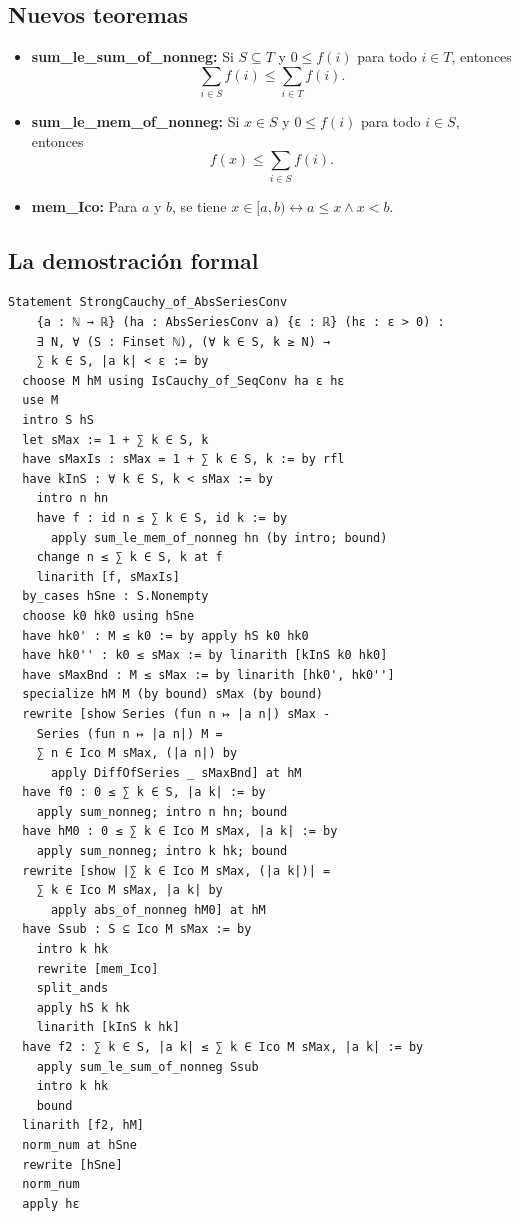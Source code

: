 \subsection{Nuevos teoremas}

\begin{itemize}
  \item \textbf{sum\_le\_sum\_of\_nonneg:} Si $S \subseteq T$ y $0 \le f(i)$ para todo $i \in T$, entonces
  \[
    \sum_{i \in S} f(i) \le \sum_{i \in T} f(i).
  \]
  \item \textbf{sum\_le\_mem\_of\_nonneg:} Si $x \in S$ y $0 \le f(i)$ para todo $i \in S$, entonces
  \[
    f(x) \le \sum_{i \in S} f(i).
  \]
  \item \textbf{mem\_Ico:} Para $a$ y $b$, se tiene $x \in [a, b) \leftrightarrow a \le x \wedge x < b$.
\end{itemize}

\subsection{La demostración formal}

\begin{verbatim}
Statement StrongCauchy_of_AbsSeriesConv
    {a : ℕ → ℝ} (ha : AbsSeriesConv a) {ε : ℝ} (hε : ε > 0) :
    ∃ N, ∀ (S : Finset ℕ), (∀ k ∈ S, k ≥ N) →
    ∑ k ∈ S, |a k| < ε := by
  choose M hM using IsCauchy_of_SeqConv ha ε hε
  use M
  intro S hS
  let sMax := 1 + ∑ k ∈ S, k
  have sMaxIs : sMax = 1 + ∑ k ∈ S, k := by rfl
  have kInS : ∀ k ∈ S, k < sMax := by
    intro n hn
    have f : id n ≤ ∑ k ∈ S, id k := by
      apply sum_le_mem_of_nonneg hn (by intro; bound)
    change n ≤ ∑ k ∈ S, k at f
    linarith [f, sMaxIs]
  by_cases hSne : S.Nonempty
  choose k0 hk0 using hSne
  have hk0' : M ≤ k0 := by apply hS k0 hk0
  have hk0'' : k0 ≤ sMax := by linarith [kInS k0 hk0]
  have sMaxBnd : M ≤ sMax := by linarith [hk0', hk0'']
  specialize hM M (by bound) sMax (by bound)
  rewrite [show Series (fun n ↦ |a n|) sMax -
    Series (fun n ↦ |a n|) M =
    ∑ n ∈ Ico M sMax, (|a n|) by
      apply DiffOfSeries _ sMaxBnd] at hM
  have f0 : 0 ≤ ∑ k ∈ S, |a k| := by
    apply sum_nonneg; intro n hn; bound
  have hM0 : 0 ≤ ∑ k ∈ Ico M sMax, |a k| := by
    apply sum_nonneg; intro k hk; bound
  rewrite [show |∑ k ∈ Ico M sMax, (|a k|)| =
    ∑ k ∈ Ico M sMax, |a k| by
      apply abs_of_nonneg hM0] at hM
  have Ssub : S ⊆ Ico M sMax := by
    intro k hk
    rewrite [mem_Ico]
    split_ands
    apply hS k hk
    linarith [kInS k hk]
  have f2 : ∑ k ∈ S, |a k| ≤ ∑ k ∈ Ico M sMax, |a k| := by
    apply sum_le_sum_of_nonneg Ssub
    intro k hk
    bound
  linarith [f2, hM]
  norm_num at hSne
  rewrite [hSne]
  norm_num
  apply hε
\end{verbatim}

